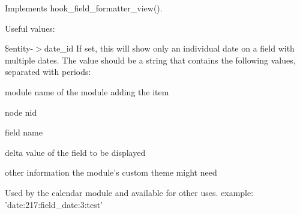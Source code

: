 \label{date_8field_8inc_a054ff404fcc81a7bd9937070266c87a6}
Implements hook\_\-field\_\-formatter\_\-view().

Useful values:

\$entity-\/$>$date\_\-id If set, this will show only an individual date on a field with multiple dates. The value should be a string that contains the following values, separated with periods:
\begin{DoxyItemize}
\item module name of the module adding the item
\item node nid
\item field name
\item delta value of the field to be displayed
\item other information the module's custom theme might need
\end{DoxyItemize}

Used by the calendar module and available for other uses. example: 'date:217:field\_\-date:3:test'

